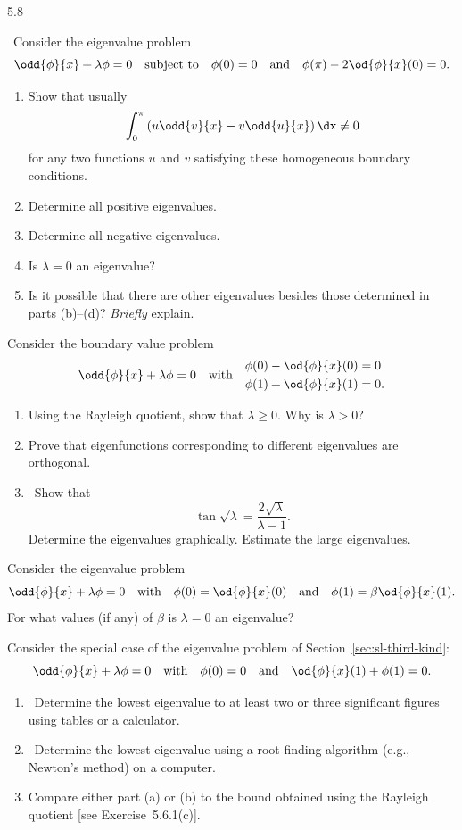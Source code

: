 \begin{exercises}{5.8}
\item\starred\ Consider the eigenvalue problem
\[
\odd{\phi}{x} + \lambda\phi = 0 \quad \text{subject to} \quad \phi(0) = 0 \quad \text{and} \quad \phi(\pi) - 2\od{\phi}{x}(0) = 0.
\]
\begin{enumerate}
\item Show that usually
\[
\int_0^{\pi}\left(u\odd{v}{x} - v\odd{u}{x}\right)\dx \neq 0
\]
for any two functions $u$ and $v$ satisfying these homogeneous boundary conditions.
\item Determine all positive eigenvalues.
\item Determine all negative eigenvalues.
\item Is $\lambda = 0$ an eigenvalue?
\item Is it possible that there are other eigenvalues besides those determined in parts (b)--(d)?  \textit{Briefly} explain.
\end{enumerate}

\item Consider the boundary value problem
\[
\odd{\phi}{x} + \lambda\phi = 0 \quad \text{with}\quad \begin{aligned} \phi(0) - \od{\phi}{x}(0) &= 0 \\ \phi(1) + \od{\phi}{x}(1) &= 0. \end{aligned}
\]
\begin{enumerate}
\item Using the Rayleigh quotient, show that $\lambda \ge 0$.  Why is $\lambda > 0$?
\item Prove that eigenfunctions corresponding to different eigenvalues are orthogonal.
\item\starred\ Show that
\[
\tan\sqrt{\lambda} = \frac{2\sqrt{\lambda}}{\lambda - 1}.
\]
Determine the eigenvalues graphically.  Estimate the large eigenvalues.
\end{enumerate}

\item Consider the eigenvalue problem
\[
\odd{\phi}{x} + \lambda\phi = 0 \quad \text{with} \quad \phi(0) = \od{\phi}{x}(0) \quad \text{and} \quad \phi(1) = \beta\od{\phi}{x}(1).
\]
For what values (if any) of $\beta$ is $\lambda = 0$ an eigenvalue?

\item Consider the special case of the eigenvalue problem of Section~\ref{sec:sl-third-kind}:
\[
\odd{\phi}{x} + \lambda\phi = 0 \quad \text{with} \quad \phi(0) = 0 \quad \text{and} \quad \od{\phi}{x}(1) + \phi(1) = 0.
\]
\begin{enumerate}
\item\starred\ Determine the lowest eigenvalue to at least two or three significant figures using tables or a calculator.
\item\starred\ Determine the lowest eigenvalue using a root-finding algorithm (e.g., Newton's method) on a computer.
\item Compare either part (a) or (b) to the bound obtained using the Rayleigh quotient [see Exercise~5.6.1(c)].
\end{enumerate}


\end{exercises}
